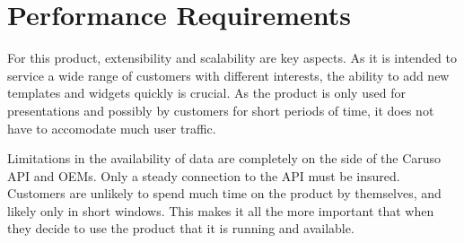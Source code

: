 \chapter{Performance Requirements}
For this product, extensibility and scalability are key aspects. 
As it is intended to service a wide range of customers with different interests, the ability to add new templates and widgets quickly is crucial.
As the product is only used for presentations and possibly by customers for short periods of time, it does not have to accomodate much user traffic.

Limitations in the availability of data are completely on the side of the Caruso API and OEMs. Only a steady connection to the API must be insured. 
Customers are unlikely to spend much time on the product by themselves, and likely only in short windows. This makes it all the more important that when they decide to use the product that it is running and available.

